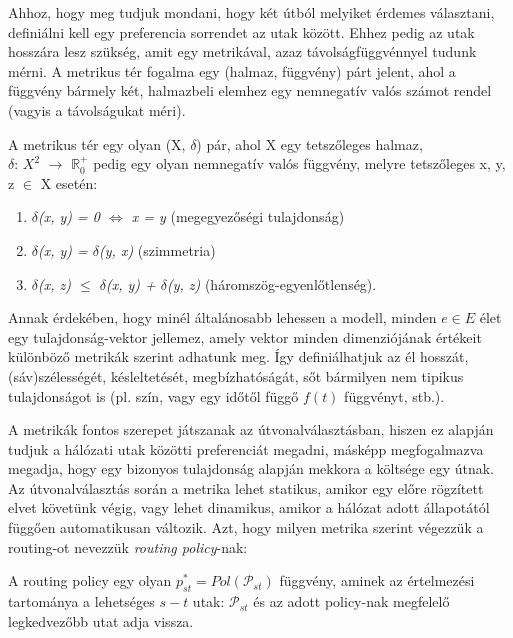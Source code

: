   Ahhoz, hogy meg tudjuk mondani, hogy két útból melyiket érdemes választani, definiálni kell egy preferencia sorrendet az utak között. Ehhez pedig az utak hosszára lesz szükség, amit egy metrikával, azaz távolságfüggvénnyel tudunk mérni. A metrikus tér fogalma egy (halmaz, függvény) párt jelent, ahol a függvény bármely két, halmazbeli elemhez egy nemnegatív valós számot rendel (vagyis a távolságukat méri). 

  \begin{definition}\label{eq:MetrikusTerDef}
    A metrikus tér egy olyan (X, $\delta$) pár, ahol X egy tetszőleges halmaz,\\$\delta$: $X^{2}$ $\rightarrow$ $\mathbb{R}^{+}_{0}$ pedig egy olyan nemnegatív valós függvény, melyre tetszőleges x, y, z $\in$ X esetén:
    \begin{enumerate}
    \item \emph{ $\delta$(x, y) = 0 $\Leftrightarrow$ x = y } (megegyezőségi tulajdonság)
    \item \emph{ $\delta$(x, y) = $\delta$(y, x) } (szimmetria)
    \item \emph{ $\delta$(x, z) $\leq$ $\delta$(x, y) + $\delta$(y, z) } (háromszög-egyenlőtlenség).
    \end{enumerate}
  \end{definition}

  Annak érdekében, hogy  minél általánosabb lehessen a modell, minden $e \in E$ élet egy tulajdonság-vektor jellemez, amely vektor minden dimenziójának értékeit különböző metrikák szerint adhatunk meg. Így definiálhatjuk az él hosszát, (sáv)szélességét, késleltetését, megbízhatóságát, sőt bármilyen nem tipikus tulajdonságot is (pl. szín, vagy egy időtől függő $f(t)$ függvényt, stb.).

  A metrikák fontos szerepet játszanak az útvonalválasztásban, hiszen ez alapján tudjuk a hálózati utak közötti preferenciát megadni, másképp megfogalmazva megadja, hogy egy bizonyos tulajdonság alapján mekkora a költsége egy útnak. Az útvonalválasztás során a metrika lehet statikus, amikor egy előre rögzített elvet követünk végig, vagy lehet dinamikus, amikor a hálózat adott állapotától függően automatikusan változik. Azt, hogy milyen metrika szerint végezzük a routing-ot nevezzük \emph{routing policy}-nak:

  \begin{definition} 
    A routing policy egy olyan $p_{st}^{*}=Pol(\mathcal{P}_{st})$ függvény, aminek az értelmezési tartománya a lehetséges $s - t$ utak: $\mathcal{P}_{st}$ és az adott policy-nak megfelelő legkedvezőbb utat adja vissza.
  \end{definition}

